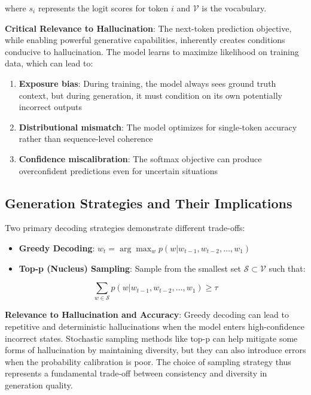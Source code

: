 where $s_i$ represents the logit scores for token $i$ and $\mathcal{V}$ is the vocabulary.

\textbf{Critical Relevance to Hallucination}: The next-token prediction objective, while enabling powerful generative capabilities, inherently creates conditions conducive to hallucination. The model learns to maximize likelihood on training data, which can lead to:

\begin{enumerate}
\item \textbf{Exposure bias}: During training, the model always sees ground truth context, but during generation, it must condition on its own potentially incorrect outputs
\item \textbf{Distributional mismatch}: The model optimizes for single-token accuracy rather than sequence-level coherence
\item \textbf{Confidence miscalibration}: The softmax objective can produce overconfident predictions even for uncertain situations
\end{enumerate}

\subsection{Generation Strategies and Their Implications}

Two primary decoding strategies demonstrate different trade-offs:

\begin{itemize}
\item \textbf{Greedy Decoding}: $w_t = \arg\max_w p(w|w_{t-1}, w_{t-2}, \ldots, w_1)$
\item \textbf{Top-p (Nucleus) Sampling}: Sample from the smallest set $\mathcal{S} \subset \mathcal{V}$ such that:
\end{itemize}

\begin{equation}
\sum_{w \in \mathcal{S}} p(w|w_{t-1}, w_{t-2}, \ldots, w_1) \geq \tau
\end{equation}

\textbf{Relevance to Hallucination and Accuracy}: Greedy decoding can lead to repetitive and deterministic hallucinations when the model enters high-confidence incorrect states. Stochastic sampling methods like top-p can help mitigate some forms of hallucination by maintaining diversity, but they can also introduce errors when the probability calibration is poor. The choice of sampling strategy thus represents a fundamental trade-off between consistency and diversity in generation quality.

